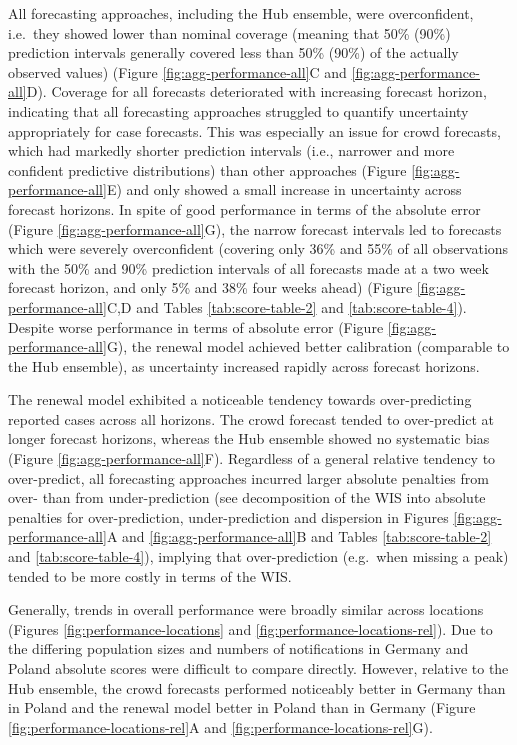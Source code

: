 \documentclass[
]{article}
\begin{document}
All forecasting approaches, including the Hub ensemble, were overconfident, i.e.~they showed lower than nominal coverage (meaning that 50\% (90\%) prediction intervals generally covered less than 50\% (90\%) of the actually observed values) (Figure \ref{fig:agg-performance-all}C and \ref{fig:agg-performance-all}D). Coverage for all forecasts deteriorated with increasing forecast horizon, indicating that all forecasting approaches struggled to quantify uncertainty appropriately for case forecasts. This was especially an issue for crowd forecasts, which had markedly shorter prediction intervals (i.e., narrower and more confident predictive distributions) than other approaches (Figure \ref{fig:agg-performance-all}E) and only showed a small increase in uncertainty across forecast horizons. In spite of good performance in terms of the absolute error (Figure \ref{fig:agg-performance-all}G), the narrow forecast intervals led to forecasts which were severely overconfident (covering only 36\% and 55\% of all observations with the 50\% and 90\% prediction intervals of all forecasts made at a two week forecast horizon, and only 5\% and 38\% four weeks ahead) (Figure \ref{fig:agg-performance-all}C,D and Tables \ref{tab:score-table-2} and \ref{tab:score-table-4}). Despite worse performance in terms of absolute error (Figure \ref{fig:agg-performance-all}G), the renewal model achieved better calibration (comparable to the Hub ensemble), as uncertainty increased rapidly across forecast horizons.

The renewal model exhibited a noticeable tendency towards over-predicting reported cases across all horizons. The crowd forecast tended to over-predict at longer forecast horizons, whereas the Hub ensemble showed no systematic bias (Figure \ref{fig:agg-performance-all}F). Regardless of a general relative tendency to over-predict, all forecasting approaches incurred larger absolute penalties from over- than from under-prediction (see decomposition of the WIS into absolute penalties for over-prediction, under-prediction and dispersion in Figures \ref{fig:agg-performance-all}A and \ref{fig:agg-performance-all}B and Tables \ref{tab:score-table-2} and \ref{tab:score-table-4}), implying that over-prediction (e.g.~when missing a peak) tended to be more costly in terms of the WIS.

Generally, trends in overall performance were broadly similar across locations (Figures \ref{fig:performance-locations} and \ref{fig:performance-locations-rel}).
Due to the differing population sizes and numbers of notifications in Germany and Poland absolute scores were difficult to compare directly. However, relative to the Hub ensemble, the crowd forecasts performed noticeably better in Germany than in Poland and the renewal model better in Poland than in Germany (Figure \ref{fig:performance-locations-rel}A and \ref{fig:performance-locations-rel}G).
\end{document}
